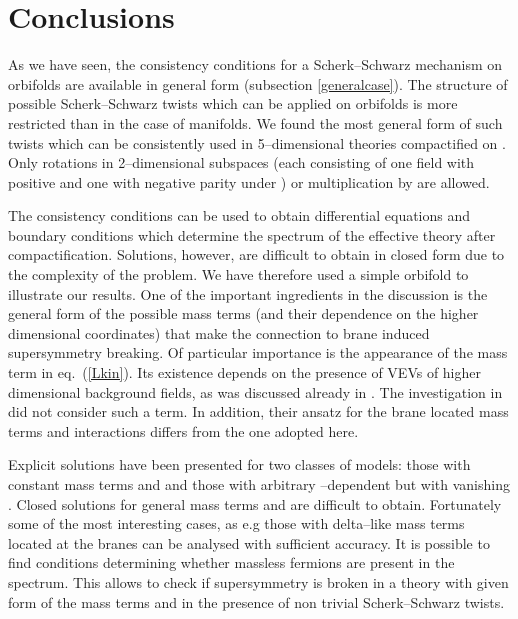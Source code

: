 \documentclass[a4paper,12pt]{article}
\def\ZZ{\mathbb Z}
\begin{document}
\section{Conclusions}


As we have seen, the consistency conditions for a Scherk--Schwarz
mechanism on orbifolds are available in general form  
(subsection \ref{generalcase}). The structure of possible
Scherk--Schwarz twists which can be applied on orbifolds is more
restricted than in the case of manifolds. We found the most general
form of such twists which can be consistently used in 5--dimensional
theories compactified on \myHighlight{$S^1/\ZZ_2$}\coordHE{}. Only rotations in 2--dimensional
subspaces (each consisting of one field with positive and one with
negative parity under \myHighlight{$\ZZ_2$}\coordHE{}) or multiplication by \coordHE{} are allowed.


The consistency conditions can be used to obtain
differential equations and boundary conditions which determine the
spectrum of the effective theory after compactification.
Solutions, however, are difficult to obtain in closed form due to the
complexity of the problem. We have therefore used a simple \myHighlight{$S^1/\ZZ_2$}\coordHE{}
orbifold to illustrate our results. One of the important ingredients
in the discussion is the general form of the possible mass terms (and
their dependence on the higher dimensional coordinates) that make the
connection to brane induced supersymmetry breaking. Of particular
importance is the appearance of the mass term \coordHE{} in eq.\
(\ref{Lkin}). Its existence depends on the presence of VEVs of higher 
dimensional background fields, as was discussed already in
\cite{Meissner:1999ja}. The investigation in
\cite{Bagger:2001qi,Bagger:2001ep} did not consider such a term. 
In addition, their ansatz for the brane located mass terms and
interactions differs from the one adopted here.


Explicit solutions have been presented for two classes of models:
those with constant mass terms \myHighlight{$m_+$}\coordHE{} and \coordHE{} and those with
arbitrary \myHighlight{$y$}\coordHE{}--dependent \coordHE{} but with vanishing \coordHE{}. 
Closed solutions for general mass terms \myHighlight{$m_+(y)$}\coordHE{} and \myHighlight{$m_-(y)$}\coordHE{} are
difficult to obtain. Fortunately some of the most interesting cases,
as e.g those with delta--like mass terms located at the branes can be
analysed with sufficient accuracy. It is possible to find conditions
determining whether massless fermions are present in the
spectrum. This allows to check if supersymmetry is broken in a theory
with given form of the mass terms \myHighlight{$m_+(y)$}\coordHE{} and \coordHE{} in the
presence of non trivial Scherk--Schwarz twists. 
\end{document}
